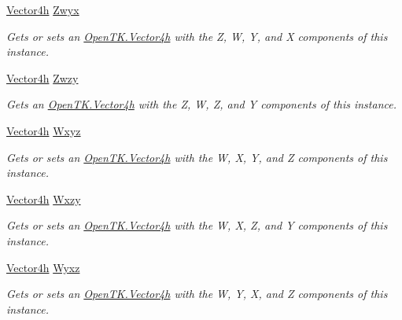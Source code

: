 \begin{DoxyCompactItemize}
\hyperlink{struct_open_t_k_1_1_vector4h}{Vector4h} \hyperlink{struct_open_t_k_1_1_vector4h_a3c13dce4324c20ce89b374eb7c4dc963}{Zwyx}
\begin{DoxyCompactList}\small\item\em Gets or sets an \hyperlink{struct_open_t_k_1_1_vector4h}{Open\-T\-K.\-Vector4h} with the Z, W, Y, and X components of this instance. \end{DoxyCompactList}\item 
\hyperlink{struct_open_t_k_1_1_vector4h}{Vector4h} \hyperlink{struct_open_t_k_1_1_vector4h_af4d5e52d5c3c7b437c6cab6162feded1}{Zwzy}
\begin{DoxyCompactList}\small\item\em Gets an \hyperlink{struct_open_t_k_1_1_vector4h}{Open\-T\-K.\-Vector4h} with the Z, W, Z, and Y components of this instance. \end{DoxyCompactList}\item 
\hyperlink{struct_open_t_k_1_1_vector4h}{Vector4h} \hyperlink{struct_open_t_k_1_1_vector4h_ae6ad5e7e9762cfa70bb7abf72b37cc6e}{Wxyz}
\begin{DoxyCompactList}\small\item\em Gets or sets an \hyperlink{struct_open_t_k_1_1_vector4h}{Open\-T\-K.\-Vector4h} with the W, X, Y, and Z components of this instance. \end{DoxyCompactList}\item 
\hyperlink{struct_open_t_k_1_1_vector4h}{Vector4h} \hyperlink{struct_open_t_k_1_1_vector4h_a896704c1bef920ea78604f73d46187a8}{Wxzy}
\begin{DoxyCompactList}\small\item\em Gets or sets an \hyperlink{struct_open_t_k_1_1_vector4h}{Open\-T\-K.\-Vector4h} with the W, X, Z, and Y components of this instance. \end{DoxyCompactList}\item 
\hyperlink{struct_open_t_k_1_1_vector4h}{Vector4h} \hyperlink{struct_open_t_k_1_1_vector4h_ae6eef383b21d1a70b5db208a5d685b49}{Wyxz}
\begin{DoxyCompactList}\small\item\em Gets or sets an \hyperlink{struct_open_t_k_1_1_vector4h}{Open\-T\-K.\-Vector4h} with the W, Y, X, and Z components of this instance. \end{DoxyCompactList}\item 

\end{DoxyCompactItemize}
